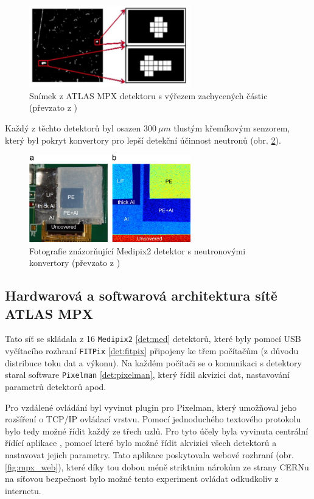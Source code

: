 \begin{figure}[ht]
	\begin{center}
		\includegraphics[width=7cm]{figures/mpx_cluster.png}
		\caption{Snímek z ATLAS MPX detektoru s výřezem zachycených částic (převzato z \cite{atlasmpx})}
		\label{fig:mpx_cluster}
	\end{center}
\end{figure}


Každý z těchto detektorů byl osazen $300~\mu m$ tlustým křemíkovým senzorem, který byl pokryt konvertory pro lepší detekční účinnost neutronů (obr. \ref{fig:mpx_lay}).

\begin{figure}[ht]
	\begin{center}
		\includegraphics[width=7cm]{figures/mpx-layers.jpg}
		\caption{Fotografie znázorňující Medipix2 detektor s neutronovými konvertory (převzato z \cite{Vykydal200935})}
		\label{fig:mpx_lay}
	\end{center}
\end{figure}

\subsection{Hardwarová a softwarová architektura sítě ATLAS MPX}
Tato síť se skládala z 16 \texttt{Medipix2} \ref{det:med} detektorů, které byly pomocí USB vyčítacího rozhraní \texttt{FITPix} \ref{det:fitpix} připojeny ke třem počítačům (z důvodu distribuce toku dat a výkonu). Na každém počítači se o komunikaci s detektory staral software \texttt{Pixelman} \ref{det:pixelman}, který řídil akvizici dat, nastavování parametrů detektorů apod. 

Pro vzdálené ovládání byl vyvinut plugin pro Pixelman, který umožňoval jeho rozšíření o TCP/IP ovládací vrstvu. Pomocí jednoduchého textového protokolu bylo tedy možné řídit každý ze třech uzlů. Pro tyto účely byla vyvinuta centrální řídící aplikace \cite{Turecek2011S45}, pomocí které bylo možné řídit akvizici všech detektorů a nastavovat jejich parametry. Tato aplikace poskytovala webové rozhraní (obr. \ref{fig:mpx_web}), které díky tou dobou méně 
striktním nárokům ze strany CERNu na síťovou bezpečnost bylo možné tento experiment ovládat odkudkoliv z internetu.

